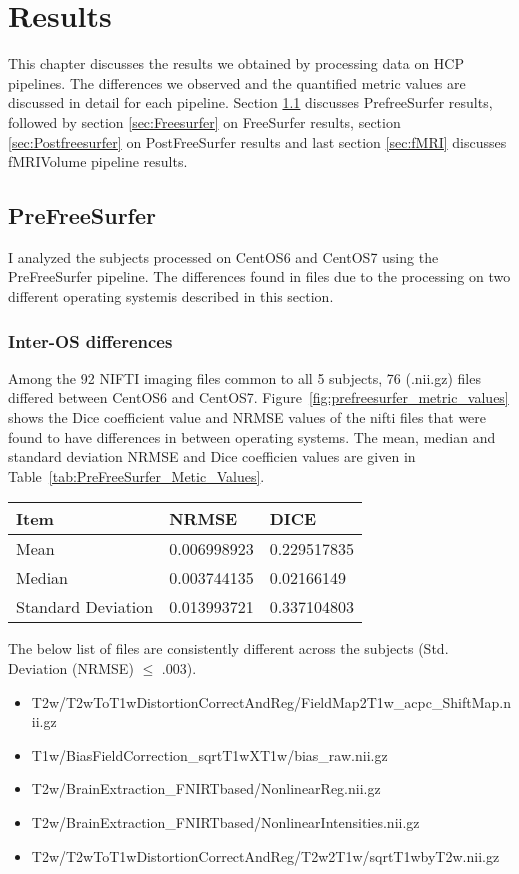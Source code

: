 \chapter{Results}
This chapter discusses the results we obtained by processing data on HCP pipelines. The differences we observed and the quantified metric values are discussed in detail for each pipeline. Section \ref{sec:Prefreesurfer} discusses PrefreeSurfer results, followed by section \ref{sec:Freesurfer} on FreeSurfer results, section \ref{sec:Postfreesurfer} on PostFreeSurfer results and last section \ref{sec:fMRI} discusses fMRIVolume pipeline results.

\section{PreFreeSurfer} \label{sec:Prefreesurfer}
I analyzed the subjects processed on CentOS6 and CentOS7 using the PreFreeSurfer pipeline. The differences found in files due to the processing on two different operating systemis described in this section.

\subsection{Inter-OS differences}
Among the 92 NIFTI imaging files common to all 5 subjects, 76 (.nii.gz) files differed between CentOS6 and CentOS7. Figure~\ref{fig:prefreesurfer_metric_values} shows the Dice coefficient value and NRMSE values of the nifti files that were found to have differences in between operating systems. The mean, median and standard deviation NRMSE and Dice coefficien values are given in Table~\ref{tab:PreFreeSurfer_Metic_Values}.
\hfill \break
\begin{center}
\begin{tabular}{|l|l|l|}
\hline
Item               & NRMSE       & DICE        \\ \hline
Mean               & 0.006998923 & 0.229517835 \\ \hline
Median             & 0.003744135 & 0.02166149  \\ \hline
Standard Deviation & 0.013993721 & 0.337104803 \\ \hline
\end{tabular}
\label{tab:PreFreeSurfer_Metic_Values}
\end{center}
\hfill \break
The below list of files  are consistently different across the subjects (Std. Deviation (NRMSE) $\leq$ .003).
\begin{itemize} 
  \item T2w/T2wToT1wDistortionCorrectAndReg/FieldMap2T1w\_acpc\_ShiftMap.nii.gz
  \item T1w/BiasFieldCorrection\_sqrtT1wXT1w/bias\_raw.nii.gz
  \item T2w/BrainExtraction\_FNIRTbased/NonlinearReg.nii.gz
  \item T2w/BrainExtraction\_FNIRTbased/NonlinearIntensities.nii.gz
  \item T2w/T2wToT1wDistortionCorrectAndReg/T2w2T1w/sqrtT1wbyT2w.nii.gz
\end{itemize}

